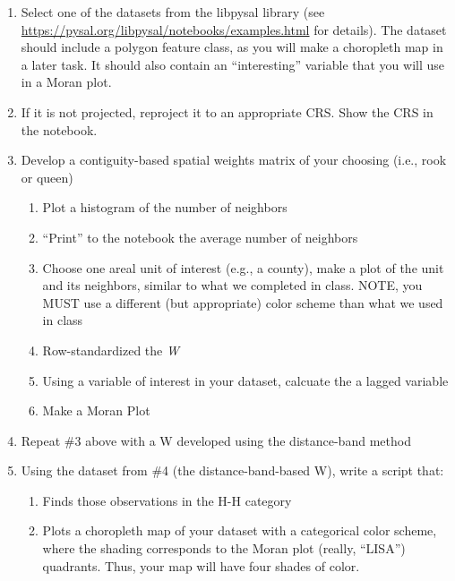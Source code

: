 \documentclass[]{article}
\providecommand{\tightlist}{%
  \setlength{\itemsep}{0pt}\setlength{\parskip}{0pt}}
\begin{document}
\begin{enumerate}
\def\labelenumi{\arabic{enumi}.}
\item
  Select one of the datasets from the libpysal library (see
  \url{https://pysal.org/libpysal/notebooks/examples.html} for details).
  The dataset should include a polygon feature class, as you will make a
  choropleth map in a later task. It should also contain an
  ``interesting'' variable that you will use in a Moran plot.
\item
  If it is not projected, reproject it to an appropriate CRS. Show the
  CRS in the notebook.
\item
  Develop a contiguity-based spatial weights matrix of your choosing
  (i.e., rook or queen)

  \begin{enumerate}
  \def\labelenumii{\arabic{enumii}.}
  \tightlist
  \item
    Plot a histogram of the number of neighbors
  \item
    ``Print'' to the notebook the average number of neighbors
  \item
    Choose one areal unit of interest (e.g., a county), make a plot of
    the unit and its neighbors, similar to what we completed in class.
    NOTE, you MUST use a different (but appropriate) color scheme than
    what we used in class
  \item
    Row-standardized the \emph{W}
  \item
    Using a variable of interest in your dataset, calcuate the a lagged
    variable
  \item
    Make a Moran Plot
  \end{enumerate}
\item
  Repeat \#3 above with a W developed using the distance-band method
\item
  Using the dataset from \#4 (the distance-band-based W), write a script
  that:

  \begin{enumerate}
  \def\labelenumii{\arabic{enumii}.}
  \tightlist
  \item
    Finds those observations in the H-H category
  \item
    Plots a choropleth map of your dataset with a categorical color
    scheme, where the shading corresponds to the Moran plot (really,
    ``LISA'') quadrants. Thus, your map will have four shades of color.
  \end{enumerate}
\end{enumerate}
\end{document}
